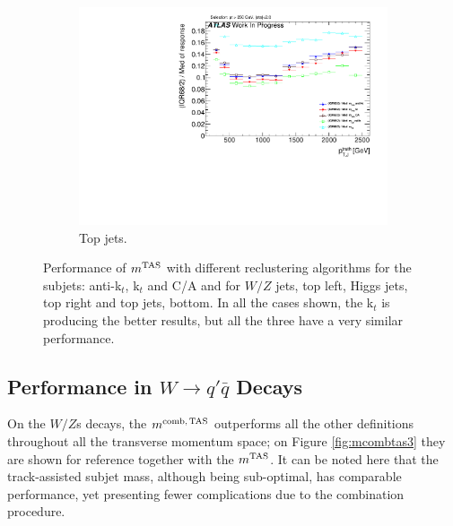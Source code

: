 \begin{figure}
    \begin{subfigure}[b]{0.45\textwidth}
        \centering
   \includegraphics[width=\textwidth]{jet_part/mtas/71graphcftr_h_JetRatio_mJ12CALOTopsCalib.pdf}
    \caption{Top jets.}
    \label{fig:allalgotop}
    \end{subfigure}

\caption{Performance of $m^\textrm{TAS}$ with different reclustering algorithms for the subjets: anti-k$_t$, k$_t$ and C/A and for $W/Z$ jets, top left, Higgs jets, top right and top jets, bottom. In all the cases shown, the k$_t$ is producing the better results, but all the three have a very similar performance.}
\end{figure}


\subsection{Performance in $W \to q'\bar{q}$ Decays}
On the $W/Z$s decays, the $m^\textrm{comb,\,TAS}$ outperforms all the other definitions throughout all the transverse momentum space; on Figure \ref{fig:mcombtas3} they are shown for reference together with the $m^\textrm{TAS}$. It can be noted here that the track-assisted subjet mass, although being sub-optimal, has comparable performance, yet presenting fewer complications due to the combination procedure.




